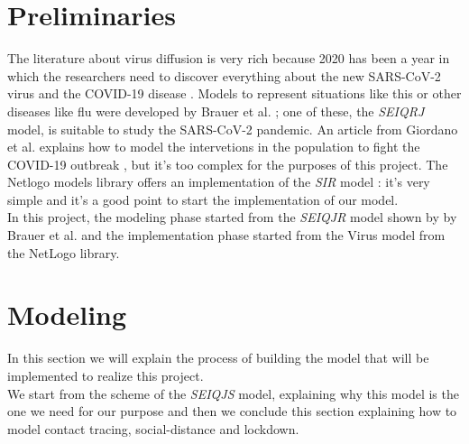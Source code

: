 \documentclass[12pt]{llncs}
\begin{document}
\section{Preliminaries}
The literature about virus diffusion is very rich because 2020 has been a year in which the researchers need to discover everything about the new SARS-CoV-2 virus and the COVID-19 disease \cite{singhal}. Models to represent situations like this or other diseases like flu were developed by Brauer et al. \cite{brauer}; one of these, the \textit{SEIQRJ} model, is suitable to study the SARS-CoV-2 pandemic. An article from Giordano et al. explains how to model the intervetions in the population to fight the COVID-19 outbreak \cite{giordano}, but it's too complex for the purposes of this project. The Netlogo \cite{netlogo} models library offers an implementation of the \textit{SIR} model \cite{netlogo-virus}: it's very simple and it's a good point to start the implementation of our model.\\ 
In this project, the modeling phase started from the \textit{SEIQJR} model shown by by Brauer et al. and the implementation phase started from the Virus model from the NetLogo library.

\section{Modeling}
In this section we will explain the process of building the model that will be implemented to realize this project.\\
We start from the scheme of the \textit{SEIQJS} model, explaining why this model is the one we need for our purpose and then we conclude this section explaining how to model contact tracing, social-distance and lockdown.
\end{document}
